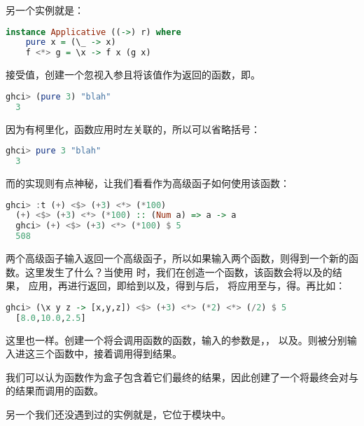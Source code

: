 \documentclass[./main.tex]{subfiles}
\begin{document}
另一个实例就是：

\begin{lstlisting}[language=Haskell]
  instance Applicative ((->) r) where
    pure x = (\_ -> x)
    f <*> g = \x -> f x (g x)
\end{lstlisting}

接受值，创建一个忽视入参且将该值作为返回的函数，即。

\begin{lstlisting}[language=Haskell]
  ghci> (pure 3) "blah"
  3
\end{lstlisting}

因为有柯里化，函数应用时左关联的，所以可以省略括号：

\begin{lstlisting}[language=Haskell]
  ghci> pure 3 "blah"
  3
\end{lstlisting}

而\acode{<*>}的实现则有点神秘，让我们看看作为高级函子如何使用该函数：

\begin{lstlisting}[language=Haskell]
  ghci> :t (+) <$> (+3) <*> (*100)
  (+) <$> (+3) <*> (*100) :: (Num a) => a -> a
  ghci> (+) <$> (+3) <*> (*100) $ 5
  508
\end{lstlisting}

两个高级函子输入\acode{<*>}返回一个高级函子，所以如果输入两个函数，则得到一个新的函数。这里发生了什么？当使用
时，我们在创造一个函数，该函数会将以及的结果，
应用\acode{+}，再进行返回，即给到以及，得到与后，
将\acode{+}应用至与，得。再比如：

\begin{lstlisting}[language=Haskell]
  ghci> (\x y z -> [x,y,z]) <$> (+3) <*> (*2) <*> (/2) $ 5
  [8.0,10.0,2.5]
\end{lstlisting}

这里也一样。创建一个将会调用函数的函数，输入的参数是，，
以及。则被分别输入进这三个函数中，接着调用得到结果。

我们可以认为函数作为盒子包含着它们最终的结果，因此创建了一个将最终会对与
的结果而调用的函数。

另一个我们还没遇到过的实例就是，它位于模块中。
\end{document}
